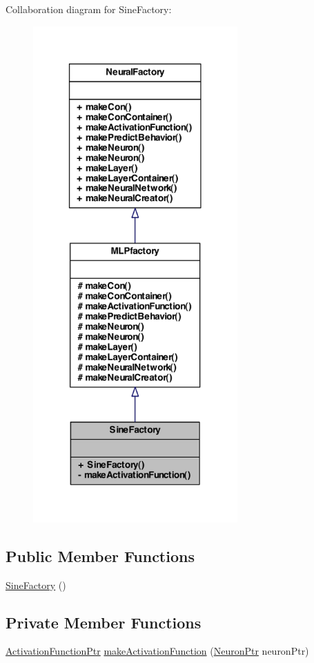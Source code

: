 Collaboration diagram for SineFactory:
\nopagebreak
\begin{figure}[H]
\begin{center}
\leavevmode
\includegraphics[width=222pt]{class_sine_factory__coll__graph}
\end{center}
\end{figure}
\subsection*{Public Member Functions}
\begin{DoxyCompactItemize}
\item 
\hyperlink{class_sine_factory_a52f4a786cbd7384515e7ff0e6e4099d5}{SineFactory} ()
\end{DoxyCompactItemize}
\subsection*{Private Member Functions}
\begin{DoxyCompactItemize}
\item 
\hyperlink{_a_m_o_r_e_8h_a77602a0277a02e5769c3df0adc669b17}{ActivationFunctionPtr} \hyperlink{class_sine_factory_aca81bca10dbcac538f58209270ebd26d}{makeActivationFunction} (\hyperlink{_a_m_o_r_e_8h_ac1ea936c2c7728eb382278131652fef4}{NeuronPtr} neuronPtr)
\end{DoxyCompactItemize}


